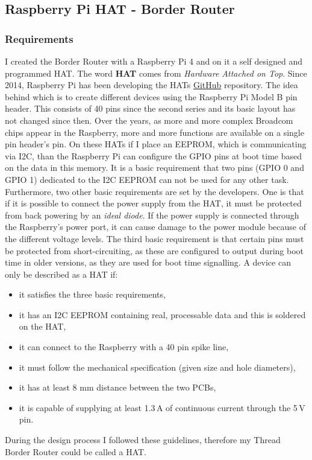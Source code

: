 \subsection{Raspberry Pi HAT - Border Router}
\subsubsection{Requirements}
I created the Border Router with a Raspberry Pi 4 and on it a self designed and programmed HAT. The word \textbf{HAT} comes from \textit{Hardware Attached on Top}. Since 2014, Raspberry Pi has been developing the HATs \href{https://github.com/raspberrypi/hats}{GitHub}\cite{HATSGitHub} repository. The idea behind which is to create different devices using the Raspberry Pi Model B pin header. This consists of 40 pins since the second series and its basic layout has not changed since then. Over the years, as more and more complex Broadcom chips appear in the Raspberry, more and more functions are available on a single pin header's pin. On these HATs if I place an EEPROM, which is communicating via I2C, than the Raspberry Pi can configure the GPIO pins at boot time based on the data in this memory.
It is a basic requirement that two pins (GPIO 0 and GPIO 1) dedicated to the I2C EEPROM can not be used for any other task. Furthermore, two other basic requirements are set by the developers. One is that if it is possible to connect the power supply from the HAT, it must be protected from back powering by an \textit{ideal diode}. If the power supply is connected through the Raspberry's power port, it can cause damage to the power module because of the different voltage levels. The third basic requirement is that certain pins must be protected from short-circuiting, as these are configured to output during boot time in older versions, as they are used for boot time signalling.
A device can only be described as a HAT if:
\clearpage
\begin{itemize}
    \item it satisfies the three basic requirements,
    \item it has an I2C EEPROM containing real, processable data and this is soldered on the HAT,
    \item it can connect to the Raspberry with a 40 pin spike line,
    \item it must follow the mechanical specification (given size and hole diameters),
    \item it has at least 8 mm distance between the two PCBs,
    \item it is capable of supplying at least 1.3\,\si{\ampere} of continuous current through the 5\,\si{\volt} pin.
\end{itemize}
During the design process I followed these guidelines, therefore my Thread Border Router could be called a HAT.

